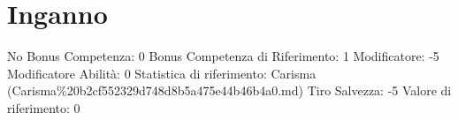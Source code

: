 \section{Inganno}\label{inganno}

\begin{description}
\tightlist
\item[Tags: ABI]
No Bonus Competenza: 0 Bonus Competenza di Riferimento: 1 Modificatore:
-5 Modificatore Abilità: 0 Statistica di riferimento: Carisma
(Carisma\%20b2cf552329d748d8b5a475e44b46b4a0.md) Tiro Salvezza: -5
Valore di riferimento: 0
\end{description}
